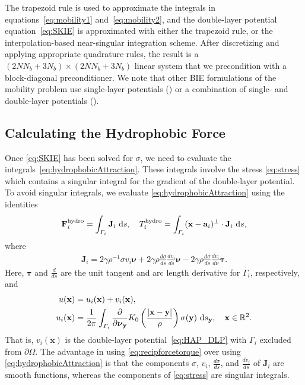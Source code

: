 \documentclass[lineno]{jfm}
\renewcommand{\aa}{\mathbf{a}}
\newcommand{\bd}{\partial}
\newcommand{\FF}{\mathbf{F}}
\newcommand{\JJ}{\mathbf{J}}
\newcommand{\nnu}{\boldsymbol{\nu}}
\newcommand{\ttau}{\boldsymbol{\tau}}
\newcommand{\xx}{\mathbf{x}}
\newcommand{\yy}{\mathbf{y}}
\newcommand{\pderiv}[2]{\frac{\partial #1}{\partial #2}}
\begin{document}
The trapezoid rule is used to approximate the integrals in
equations~\eqref{eq:mobility1} and~\eqref{eq:mobility2}, and the
double-layer potential equation~\eqref{eq:SKIE} is approximated with
either the trapezoid rule, or the interpolation-based near-singular
integration scheme. After discretizing and applying appropriate
quadrature rules, the result is a $(2NN_b + 3N_b) \times (2NN_b + 3N_b)$
linear system that we precondition with a block-diagonal preconditioner.
We note that other BIE formulations of the mobility problem use
single-layer potentials (\cite{cor-gre-rac-vee2017, rac-gre2016}) or a
combination of single- and double-layer potentials (\cite{cor-vee2018}).

\subsection{Calculating the Hydrophobic Force}
\label{subsec:calculating_force}
Once \eqref{eq:SKIE} has been solved for $\sigma$, we need to evaluate
the integrals~\eqref{eq:hydrophobicAttraction}. These integrals involve
the stress \eqref{eq:stress} which contains a singular integral for the
gradient of the double-layer potential. To avoid singular integrals, we
evaluate \eqref{eq:hydrophobicAttraction} using the identities
\begin{align}
  \label{eq:recipforcetorque}
  \FF_i^{\text{hydro}} = \int_{\Gamma_i} \JJ_i \,\dif s,\quad
  T_i^{\text{hydro}}    = \int_{\Gamma_i} 
    (\xx - \aa_i)^{\perp} \cdot \JJ_i  \,\dif s,
\end{align}
where
\begin{align}
  \label{eq:jumpstress1}
  \JJ_{i} = 2\gamma\rho^{-1} \sigma v_i \nnu + 
    2\gamma\rho \frac{d\sigma}{ds} \frac{dv_i}{ds} \nnu -
    2\gamma\rho \frac{d\sigma}{ds} \frac{dv_i}{d\nu} \ttau.
\end{align}
Here, $\ttau$ and $\frac{d}{ds}$ are the unit tangent  and arc length
derivative for $\Gamma_i$, respectively, and
\begin{equation}
\label{eq:uidef}
\begin{aligned}
    u(\xx) &= u_i(\xx) + v_i(\xx),\\
    u_i(\xx) &= \frac{1}{2\pi} \int_{\Gamma_i} \pderiv{}{\nnu_\yy}
    K_0 \left(\frac{|\xx - \yy|}{\rho}\right) \sigma(\yy) \, \dif s_\yy,
    \quad \xx \in \mathbb{R}^2.
\end{aligned}
\end{equation}
That is, $v_i(\xx)$ is the double-layer potential~\eqref{eq:HAP_DLP} with 
$\Gamma_i$ excluded from $\bd\Omega$. The advantage in
using \eqref{eq:recipforcetorque} over using \eqref{eq:hydrophobicAttraction} is that the components
$\sigma$, $v_i$, $\frac{d\sigma}{ds}$, and $\frac{dv_i}{ds}$ of $\JJ_i$ are smooth functions,
whereas the components of \eqref{eq:stress} are singular integrals.  
\end{document}

